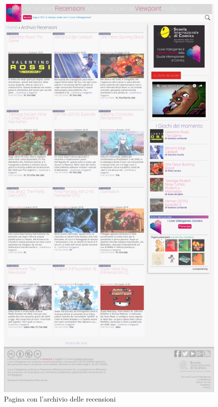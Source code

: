 \documentclass[../ProgettoTecWeb2.tex]{subfiles}
\begin{document}
	\begin{figure} [H]
			\centering
			\includegraphics[scale=0.24]{img/RecensioniCompleta}
			\caption{Pagina con l'archivio delle recensioni}
	\end{figure}
\end{document}
